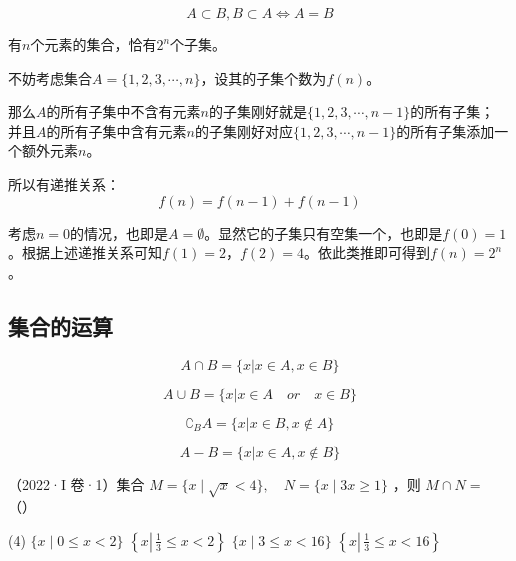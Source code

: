 \begin{definition}[相等]
    $$A\subset B, B\subset A \iff A=B$$
\end{definition}

\begin{exercise}[子集个数]
    有$n$个元素的集合，恰有$2^n$个子集。
\end{exercise}

\begin{solution}
    不妨考虑集合$A=\{1,2,3,\cdots,n\}$，设其的子集个数为$f(n)$。

    那么$A$的所有子集中不含有元素$n$的子集刚好就是$\{1,2,3,\cdots,n-1\}$的所有子集；
    并且$A$的所有子集中含有元素$n$的子集刚好对应$\{1,2,3,\cdots,n-1\}$的所有子集添加一个额外元素$n$。

    所以有递推关系：$$f(n)=f(n-1)+f(n-1) $$

    考虑$n=0$的情况，也即是$A=\emptyset$。显然它的子集只有空集一个，也即是$f(0)=1$。根据上述递推关系可知$f(1)=2$，$f(2)=4$。依此类推即可得到$f(n)=2^n$。
\end{solution}

\subsection{集合的运算}

\begin{definition}[交]
    $$A\cap B = \{x|x \in A, x \in B\}$$
\end{definition}

\begin{definition}[并]
    $$A\cup B = \{x|x \in A \quad or \quad x \in B\}$$
\end{definition}

\begin{definition}[补]
    $$\complement_B A=\{x|x\in B, x\notin A\}$$
\end{definition}

\begin{definition}[差]
    $$A-B = \{x|x\in A, x\notin B\}$$
\end{definition}

\begin{example}
    （2022·I 卷·1）集合 $M=\{x \mid \sqrt{x}<4\}, \quad N=\{x \mid 3 x \geq 1\}$ ，则 $M \cap N=$ （\qquad）
    \begin{tasks}(4)
        \task $\{x \mid 0 \leq x<2\}$
        \task $\left\{x \left\lvert\, \frac{1}{3} \leq x<2\right.\right\}$
        \task $\{x \mid 3 \leq x<16\}$
        \task $\left\{x \left\lvert\, \frac{1}{3} \leq x<16\right.\right\}$
    \end{tasks}
\end{example}

